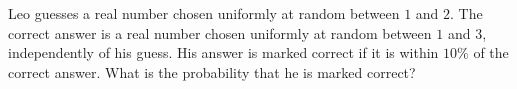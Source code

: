 Leo guesses a real number chosen uniformly at random between $1$ and $2$. The correct answer is a real number chosen uniformly at random between $1$ and $3$, independently of his guess. His answer is marked correct if it is within $10\%$ of the correct answer. What is the probability that he is marked correct?
